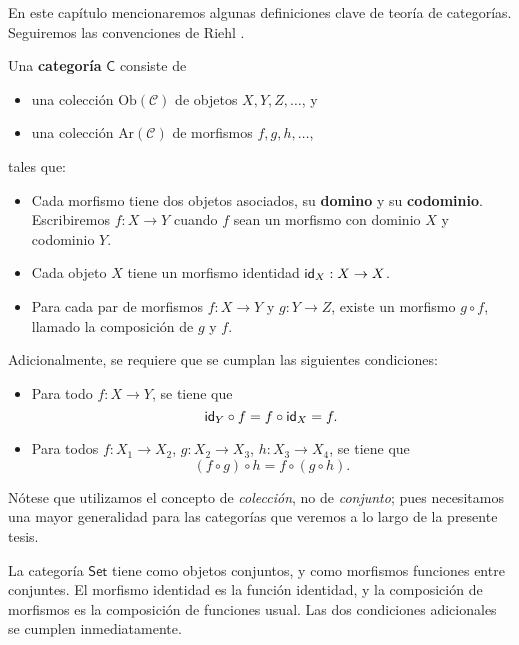 \documentclass[../main.tex]{subfiles}
\begin{document}
En este cap\'itulo mencionaremos algunas definiciones clave de teor\'ia de categor\'ias.
Seguiremos las convenciones de Riehl \cite{riehl_category_2016}.

\begin{definitionap}
    Una \textbf{categor\'ia} $\mathsf{C}$ consiste de
    \begin{itemize}
        \item una colección $\text{Ob}(\mathcal{C})$ de objetos $X,Y,Z,\dots$, y
        \item una colección $\text{Ar}(\mathcal{C})$ de morfismos $f,g,h,\dots$,
    \end{itemize}
    tales que:
    \begin{itemize}
        \item Cada morfismo tiene dos objetos asociados, su \textbf{domino} y su \textbf{codominio}. Escribiremos $f:X \to Y$ cuando $f$ sean un morfismo con dominio $X$ y codominio $Y$.
        \item Cada objeto $X$ tiene un morfismo identidad $\idfunc[X]:X \to X$.
        \item Para cada par de morfismos $f:X \to Y$ y $g: Y \to Z$, existe un morfismo $g \circ f$, llamado la composici\'on de $g$ y $f$.
    \end{itemize}
    Adicionalmente, se requiere que se cumplan las siguientes condiciones:
    \begin{itemize}
        \item Para todo $f:X \to Y$, se tiene que \[\idfunc[Y]\circ f = f \circ \idfunc[X] = f.\]
        \item Para todos $f:X_1 \to X_2$, $g:X_2 \to X_3$, $h:X_3 \to X_4$, se tiene que
              \[(f \circ g) \circ h = f \circ (g \circ h).\]
    \end{itemize}
\end{definitionap}

N\'otese que utilizamos el concepto de \textit{colecci\'on}, no de \textit{conjunto}; pues necesitamos una mayor generalidad para las categor\'ias que veremos a lo largo de la presente tesis.

\begin{exampleap}
    La categor\'ia $\mathsf{Set}$ tiene como objetos conjuntos, y como morfismos funciones entre conjuntes. El morfismo identidad es la funci\'on identidad, y la composici\'on de morfismos es la composici\'on de funciones usual. Las dos condiciones adicionales se cumplen inmediatamente.
\end{exampleap}
\end{document}
